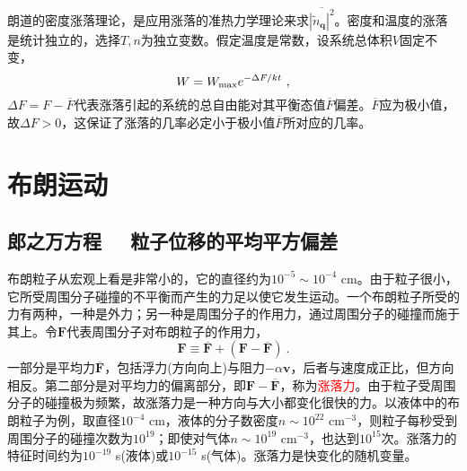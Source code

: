 \documentclass[11pt,a4paper]{article}
\renewcommand{\vec}[1]{\boldsymbol{#1}}
\begin{document}
朗道的密度涨落理论，是应用涨落的准热力学理论来求$\overline{|\tilde{n}_{\vec{q}}|^2} $。密度和温度的涨落是统计独立的，选择$T, n$为独立变数。假定温度是常数，设系统总体积$V$固定不变，
\begin{equation}
W = W_{\rm max} e^{-\Delta F/kt} ~,
\end{equation}
$\Delta F = F - \overline{F}$代表涨落引起的系统的总自由能对其平衡态值$\overline{F}$偏差。$\overline{F}$应为极小值，故$\Delta F > 0$，这保证了涨落的几率必定小于极小值$\overline{F}$所对应的几率。
















\section{布朗运动}

\subsection{郎之万方程~~ 粒子位移的平均平方偏差}
\cite{2007热力学与统计物理学} 布朗粒子从宏观上看是非常小的，它的直径约为$10^{-5} \sim 10^{-4}$ cm。由于粒子很小，它所受周围分子碰撞的不平衡而产生的力足以使它发生运动。一个布朗粒子所受的力有两种，一种是外力；另一种是周围分子的作用力，通过周围分子的碰撞而施于其上。令$\vec{F}$代表周围分子对布朗粒子的作用力，
\begin{equation}
\vec{F} \equiv \overline{\vec{F}} +(\vec{F} - \overline{\vec{F}}) ~.
\end{equation}
一部分是平均力$\overline{\vec{F}}$，包括浮力(方向向上)与阻力$-\alpha \vec{v}$，后者与速度成正比，但方向相反。第二部分是对平均力的偏离部分，即$\vec{F} - \overline{\vec{F}}$，称为\textcolor{red}{涨落力}。由于粒子受周围分子的碰撞极为频繁，故涨落力是一种方向与大小都变化很快的力。以液体中的布朗粒子为例，取直径$10^{-4}$ cm，液体的分子数密度$n\sim 10^{22}$ cm$^{-3}$，则粒子每秒受到周围分子的碰撞次数为$10^{19}$；即使对气体$n \sim 10^{19}$ cm$^{-3}$，也达到$10^{15}$次。涨落力的特征时间约为$10^{-19}$ s(液体)或$10^{-15}$ s(气体)。涨落力是快变化的随机变量。
\end{document}
